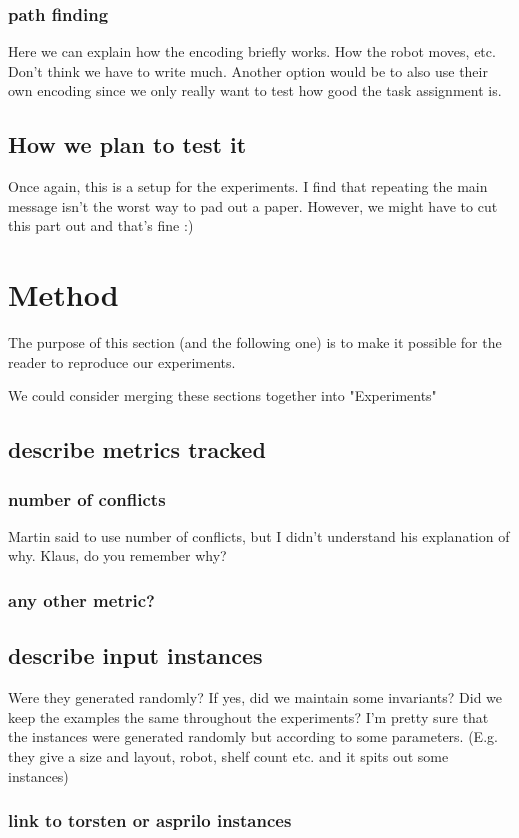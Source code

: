 \documentclass[11pt]{article}
\begin{document}
\subsubsection{path finding}
\label{sec:org69ea791}
Here we can explain how the encoding briefly works. How the robot moves, etc. Don't think we have to write much. Another option would be to also use their own encoding since we only really want to test how good the task assignment is.
\subsection{How we plan to test it}
\label{sec:org7a56bac}
Once again, this is a setup for the experiments. I find that repeating the main message isn't the worst way to pad out a paper. However, we might have to cut this part out and that's fine :)
\section{Method}
\label{sec:org8516e65}
The purpose of this section (and the following one) is to make it possible for the reader to reproduce our experiments.

We could consider merging these sections together into "Experiments"
\subsection{describe metrics tracked}
\label{sec:orgabdf258}
\subsubsection{number of conflicts}
\label{sec:org90fa98e}
Martin said to use number of conflicts, but I didn't understand his explanation of why. Klaus, do you remember why?
\subsubsection{any other metric?}
\label{sec:org0f11b40}
\subsection{describe input instances}
\label{sec:org4f81e71}
Were they generated randomly? If yes, did we maintain some invariants?
Did we keep the examples the same throughout the experiments?
I'm pretty sure that the instances were generated randomly but according to some parameters. (E.g. they give a size and layout, robot, shelf count etc. and it spits out some instances)
\subsubsection{link to torsten or asprilo instances}
\label{sec:orga248748}
\end{document}
